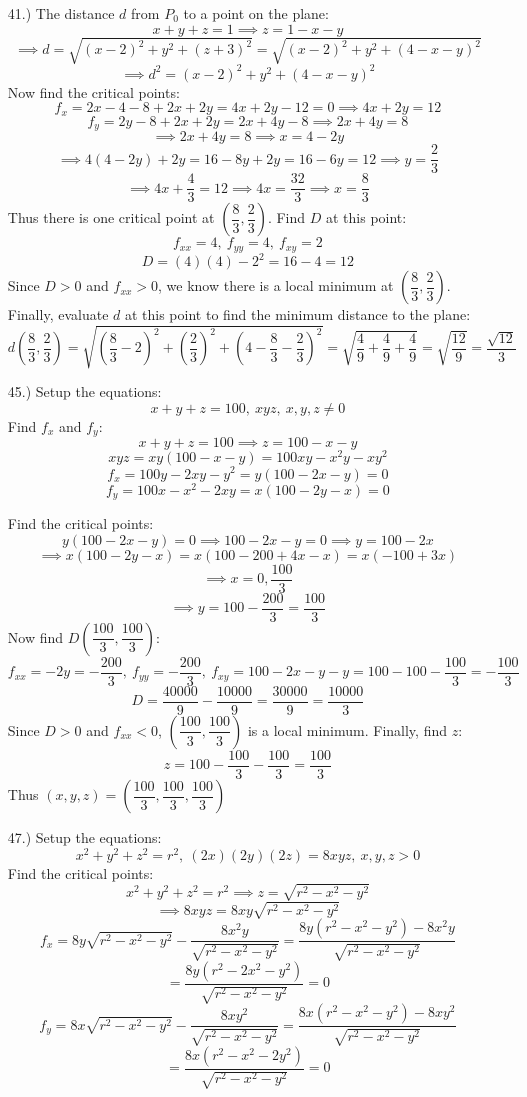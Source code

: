 \documentclass[12pt]{article}
\newcommand{\parns}[1]{\left(#1\right)}
\begin{document}
\begin{itemize}
    \item[41.)] The distance $d$ from $P_0$ to a point on the plane:
    \[x+y+z=1\implies z=1-x-y\]
    \[\implies d=\sqrt{(x-2)^2+y^2+(z+3)^2}=\sqrt{(x-2)^2+y^2+(4-x-y)^2}\]
    \[\implies d^2=(x-2)^2+y^2+(4-x-y)^2\]
    Now find the critical points:
    \[f_x=2x-4-8+2x+2y=4x+2y-12=0\implies 4x+2y=12\]
    \[f_y=2y-8+2x+2y=2x+4y-8\implies 2x+4y=8\]
    \[\implies 2x+4y=8\implies x=4-2y\]
    \[\implies 4(4-2y)+2y=16-8y+2y=16-6y=12\implies y=\frac{2}{3}\]
    \[\implies 4x+\frac{4}{3}=12\implies4x=\frac{32}{3}\implies x=\frac{8}{3}\]
    Thus there is one critical point at $\parns{\dfrac{8}{3},\dfrac{2}{3}}$. Find $D$ at this point:
    \[f_{xx}=4,\ f_{yy}=4,\ f_{xy}=2\]
    \[D=(4)(4)-2^2=16-4=12\]
    Since $D>0$ and $f_{xx}>0$, we know there is a local minimum at $\parns{\dfrac{8}{3},\dfrac{2}{3}}$. Finally, evaluate $d$ at this point to find the minimum distance to the plane:
    \[d\parns{\frac{8}{3},\frac{2}{3}}=\sqrt{\parns{\frac{8}{3}-2}^2+\parns{\frac{2}{3}}^2+\parns{4-\frac{8}{3}-\frac{2}{3}}^2}=\sqrt{\frac{4}{9}+\frac{4}{9}+\frac{4}{9}}=\sqrt{\frac{12}{9}}=\frac{\sqrt{12}}{3}\]

    \item[45.)] Setup the equations:
    \[x+y+z=100,\ xyz,\ x,y,z\neq0\]
    Find $f_x$ and $f_y$:
    \[x+y+z=100\implies z=100-x-y\]
    \[xyz=xy(100-x-y)=100xy-x^2y-xy^2\]
    \[f_x=100y-2xy-y^2=y(100-2x-y)=0\]
    \[f_y=100x-x^2-2xy=x(100-2y-x)=0\]

    \pagebreak
    Find the critical points:
    \[y(100-2x-y)=0\implies100-2x-y=0\implies y=100-2x\]
    \[\implies x(100-2y-x)=x(100-200+4x-x)=x(-100+3x)\]
    \[\implies x=0,\frac{100}{3}\]
    \[\implies y=100-\frac{200}{3}=\frac{100}{3}\]
    Now find $D\parns{\dfrac{100}{3},\dfrac{100}{3}}$:
    \[f_{xx}=-2y=-\frac{200}{3},\ f_{yy}=-\frac{200}{3},\ f_{xy}=100-2x-y-y=100-100-\frac{100}{3}=-\frac{100}{3}\]
    \[D=\frac{40000}{9}-\frac{10000}{9}=\frac{30000}{9}=\frac{10000}{3}\]
    Since $D>0$ and $f_{xx}<0$, $\parns{\dfrac{100}{3},\dfrac{100}{3}}$ is a local minimum. Finally, find $z$:
    \[z=100-\frac{100}{3}-\frac{100}{3}=\frac{100}{3}\]
    Thus $(x,y,z)=\left(\dfrac{100}{3},\dfrac{100}{3},\dfrac{100}{3}\right)$

    \item[47.)] Setup the equations:
    \[x^2+y^2+z^2=r^2,\ (2x)(2y)(2z)=8xyz,\ x,y,z>0\]
    Find the critical points:
    \[x^2+y^2+z^2=r^2\implies z=\sqrt{r^2-x^2-y^2}\]
    \[\implies8xyz=8xy\sqrt{r^2-x^2-y^2}\]
    \[f_x=8y\sqrt{r^2-x^2-y^2}-\frac{8x^2y}{\sqrt{r^2-x^2-y^2}}=\frac{8y(r^2-x^2-y^2)-8x^2y}{\sqrt{r^2-x^2-y^2}}\]
    \[=\frac{8y(r^2-2x^2-y^2)}{\sqrt{r^2-x^2-y^2}}=0\]
    \[f_y=8x\sqrt{r^2-x^2-y^2}-\frac{8xy^2}{\sqrt{r^2-x^2-y^2}}=\frac{8x(r^2-x^2-y^2)-8xy^2}{\sqrt{r^2-x^2-y^2}}\]
    \[=\frac{8x(r^2-x^2-2y^2)}{\sqrt{r^2-x^2-y^2}}=0\]


\end{itemize}
\end{document}
